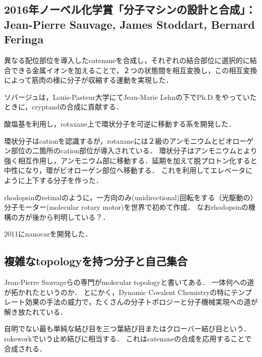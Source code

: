\documentclass[uplatex, dvipdfmx]{jsreport}
\begin{document}
\subsection{2016年ノーベル化学賞「分子マシンの設計と合成」：Jean-Pierre Sauvage, James Stoddart, Bernard Feringa}

\begin{example}
    異なる配位部位を導入したcatenaneを合成し，それぞれの結合部位に選択的に結合できる金属イオンを加えることで，２つの状態間を相互変換し，この相互変換によって筋肉の様に分子が収縮する運動を実現した．
\end{example}
\begin{remark}
    ソバージュは，Louis-Pasteur大学にてJean-Marie Lehnの下でPh.D.をやっていたときに，cryptandの合成に貢献する．
\end{remark}

\begin{example}
    酸塩基を利用し，rotaxane上で環状分子を可逆に移動する系を開発した．

    環状分子はcationを認識するが，rotaxaneには２級のアンモニウムとビオローゲン部位の二箇所のcation部位が導入されている．
    環状分子はアンモニウムとより強く相互作用し，アンモニウム部に移動する．延期を加えて脱プロトン化すると中性になり，環がビオローゲン部位へ移動する．
    これを利用してエレベータにように上下する分子を作った．
\end{example}

\begin{example}\label{exp-Feringa}
    rhodopsinのretinalのように，一方向のみ(unidirectional)回転をする（光駆動の）分子モーター(molecular rotary motor)を世界で初めて作成\cite{Ben Fringa}．
    なおrhodopsinの機構の方が後から判明している？\cite{rhodopsin}．

    2011にnanocarを開発した\cite{nanocar}．
\end{example}

\subsection{複雑なtopologyを持つ分子と自己集合}
Jean-Pierre Sauvageらの専門がmolecular topologyと書いてある．
一体何への道が拓かれたというのか．
とにかく，Dynamic Covalent Chemistryの特にテンプレート効果の手法の威力で，たくさんの分子トポロジーと分子機械実現への道が
解き放たれている．

\begin{example}
    自明でない最も単純な結び目を三つ葉結び目またはクローバー結び目という．rokeworkでいう止め結びに相当する．
    これはcatenaneの合成を応用することで合成される．
\end{example}
\end{document}
